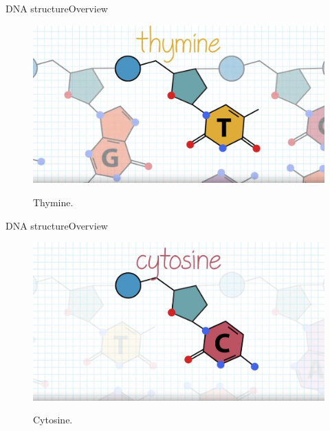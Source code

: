 \documentclass[10pt]{beamer}
\begin{document}
{%
\begin{frame}{DNA structure}{Overview}
	\begin{figure}[]
		\centering
		\includegraphics[width=\textwidth,height=0.7\textheight,keepaspectratio]{img/introduction/dna10.jpg}
		\label{img:mot2}
		\caption{Thymine.}
	\end{figure}
\end{frame}

\begin{frame}{DNA structure}{Overview}
	\begin{figure}[]
		\centering
		\includegraphics[width=\textwidth,height=0.7\textheight,keepaspectratio]{img/introduction/dna11.jpg}
		\label{img:mot2}
		\caption{Cytosine.}
	\end{figure}
\end{frame}

}
\end{document}
